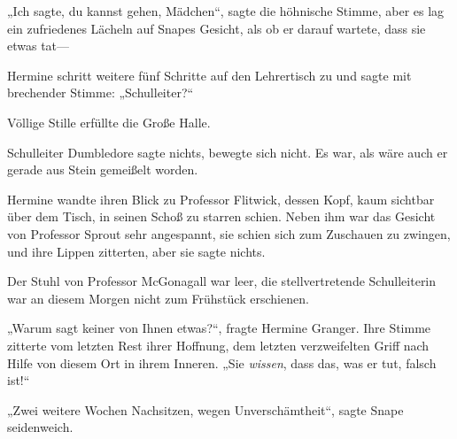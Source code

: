 „Ich sagte, du kannst gehen, Mädchen“, sagte die höhnische Stimme, aber es lag ein zufriedenes Lächeln auf Snapes Gesicht, als ob er darauf wartete, dass sie etwas tat—

Hermine schritt weitere fünf Schritte auf den Lehrertisch zu und sagte mit brechender Stimme: „Schulleiter?“

Völlige Stille erfüllte die Große Halle.

Schulleiter Dumbledore sagte nichts, bewegte sich nicht. Es war, als wäre auch er gerade aus Stein gemeißelt worden.

Hermine wandte ihren Blick zu Professor Flitwick, dessen Kopf, kaum sichtbar über dem Tisch, in seinen Schoß zu starren schien. Neben ihm war das Gesicht von Professor Sprout sehr angespannt, sie schien sich zum Zuschauen zu zwingen, und ihre Lippen zitterten, aber sie sagte nichts.

Der Stuhl von Professor McGonagall war leer, die stellvertretende Schulleiterin war an diesem Morgen nicht zum Frühstück erschienen.

„Warum sagt keiner von Ihnen etwas?“, fragte Hermine Granger. Ihre Stimme zitterte vom letzten Rest ihrer Hoffnung, dem letzten verzweifelten Griff nach Hilfe von diesem Ort in ihrem Inneren. „Sie \emph{wissen}, dass das, was er tut, falsch ist!“

„Zwei weitere Wochen Nachsitzen, wegen Unverschämtheit“, sagte Snape seidenweich.

